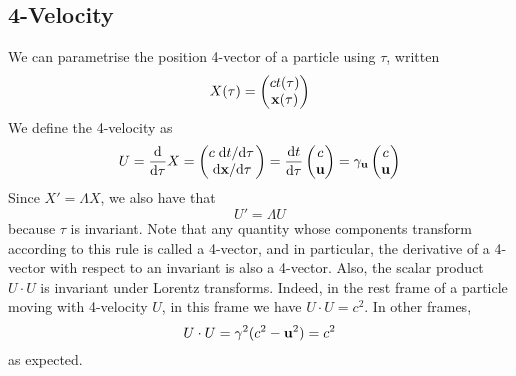 \subsection{4-Velocity}
We can parametrise the position 4-vector of a particle using \(\tau\), written
\[
	X(\tau) = \begin{pmatrix}
		ct(\tau) \\ \vb x(\tau)
	\end{pmatrix}
\]
We define the 4-velocity as
\[
	U = \dv{\tau}X = \begin{pmatrix}
		c\dv*{t}{\tau} \\ \dv*{\vb x}{\tau}
	\end{pmatrix} = \dv{t}{\tau} \begin{pmatrix}
		c \\ \vb u
	\end{pmatrix} = \gamma_{\vb u} \begin{pmatrix}
		c \\ \vb u
	\end{pmatrix}
\]
Since \(X' = \Lambda X\), we also have that
\[
	U' = \Lambda U
\]
because \(\tau\) is invariant.
Note that any quantity whose components transform according to this rule is called a 4-vector, and in particular, the derivative of a 4-vector with respect to an invariant is also a 4-vector.
Also, the scalar product \(U \cdot U\) is invariant under Lorentz transforms.
Indeed, in the rest frame of a particle moving with 4-velocity \(U\), in this frame we have \(U\cdot U = c^2\).
In other frames,
\[
	U \cdot U = \gamma^2 (c^2 - \vb u^2) = c^2
\]
as expected.

